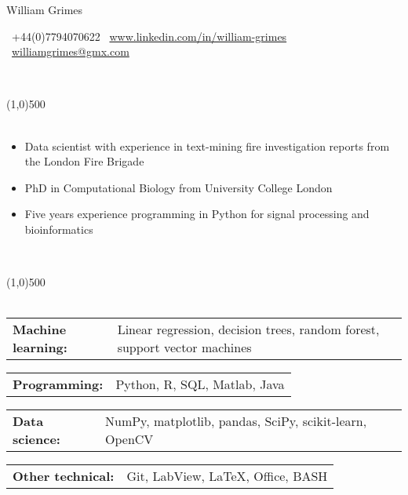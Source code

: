 \documentclass[11pt]{res}
\begin{document}
\centerline{{\Huge William Grimes}}
\vspace{-0.7em}


\Mobilefone \ \textcolor{mygray}{+44(0)7794070622 \hfill}
\ComputerMouse \ \url{www.linkedin.com/in/william-grimes} \hfill 
\Letter \ \href{mailto:williamgrimes@gmx.com}{williamgrimes@gmx.com}

\vspace{-1.0em}
\begin{flushleft}
\\
\end{flushleft}
\vspace{-3.2em}

\line(1,0){500}\\\smallskip
\vspace*{-0.8cm}
\nolinebreak\\
\textcolor{mygray}{
\begin{itemize} %
	\item Data scientist with experience in text-mining fire investigation reports from the London Fire Brigade
	\item PhD in Computational Biology from University College London 
	\item Five years experience programming in Python for signal processing and bioinformatics
\end{itemize}
}

\vspace{-1.2em}
\begin{flushleft}
\\
\end{flushleft}
\vspace{-3.2em}
\line(1,0){500}\\
\vspace*{-0.3cm}
\nolinebreak\\
\begin{tabular}{@{} p{3.3cm} p{14.0cm} @{}} {\bf Machine learning:} & \textcolor{mygray}{Linear regression, decision trees, random forest, support vector machines} \end{tabular}
\begin{tabular}{@{} p{3.3cm} p{14.0cm} @{}} {\bf Programming:} & \textcolor{mygray}{Python, R, SQL, Matlab, Java}\end{tabular}
\begin{tabular}{@{} p{3.3cm} p{14.0cm} @{}} {\bf Data science:} & \textcolor{mygray}{NumPy, matplotlib, pandas, SciPy, scikit-learn, OpenCV }\end{tabular}
\begin{tabular}{@{} p{3.3cm} p{14.0cm} @{}} {\bf Other technical:} & \textcolor{mygray}{ Git, LabView, \LaTeX, Office, BASH} \end{tabular}
\end{document}
